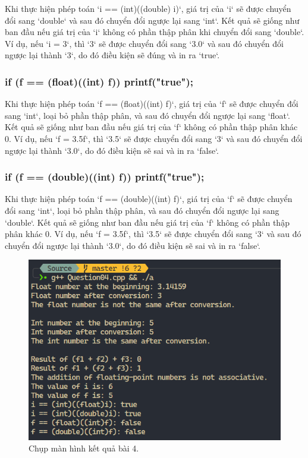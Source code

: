Khi thực hiện phép toán `i == (int)((double) i)`, giá trị của `i` sẽ được chuyển đổi sang `double` và sau đó chuyển đổi ngược lại sang `int`. Kết quả sẽ giống như ban đầu nếu giá trị của `i` không có phần thập phân khi chuyển đổi sang `double`. Ví dụ, nếu `i = 3`, thì `3` sẽ được chuyển đổi sang `3.0` và sau đó chuyển đổi ngược lại thành `3`, do đó điều kiện sẽ đúng và in ra `true`.

\subsubsection{if (f == (float)((int) f)) printf("true");}

Khi thực hiện phép toán `f == (float)((int) f)`, giá trị của `f` sẽ được chuyển đổi sang `int`, loại bỏ phần thập phân, và sau đó chuyển đổi ngược lại sang `float`. Kết quả sẽ giống như ban đầu nếu giá trị của `f` không có phần thập phân khác 0. Ví dụ, nếu `f = 3.5f`, thì `3.5` sẽ được chuyển đổi sang `3` và sau đó chuyển đổi ngược lại thành `3.0`, do đó điều kiện sẽ sai và in ra `false`.

\subsubsection{if (f == (double)((int) f)) printf("true");}

Khi thực hiện phép toán `f == (double)((int) f)`, giá trị của `f` sẽ được chuyển đổi sang `int`, loại bỏ phần thập phân, và sau đó chuyển đổi ngược lại sang `double`. Kết quả sẽ giống như ban đầu nếu giá trị của `f` không có phần thập phân khác 0. Ví dụ, nếu `f = 3.5f`, thì `3.5` sẽ được chuyển đổi sang `3` và sau đó chuyển đổi ngược lại thành `3.0`, do đó điều kiện sẽ sai và in ra `false`.


\begin{figure}[H]
	\centering
	\includegraphics[width=\textwidth]{images/img4.PNG
	}
	\caption{Chụp màn hình kết quả bài 4.}
\end{figure}
